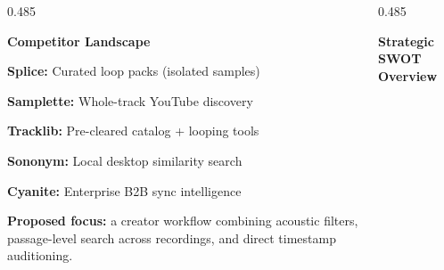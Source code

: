 \begin{frame}[t]

  \begin{columns}[onlytextwidth, T]
    \begin{column}{0.485\textwidth}
      \begin{tcolorbox}[standardcard, top=3.5pt, bottom=3.5pt, left=6pt, right=6pt]
        {\scriptsize\bfseries\textcolor{textwhite}{Competitor Landscape}}\par\vspace{1.2mm}
        
        \begin{compactlist}
          \tiny
          \item \textbf{Splice:} Curated loop packs (isolated samples)
          \item \textbf{Samplette:} Whole-track YouTube discovery
          \item \textbf{Tracklib:} Pre-cleared catalog + looping tools
          \item \textbf{Sononym:} Local desktop similarity search
          \item \textbf{Cyanite:} Enterprise B2B sync intelligence
        \end{compactlist}

        \vspace{1.5mm}
        \begin{tcolorbox}[enhanced, colback=cardinner, colframe=accentemerald, boxrule=0.8pt, arc=3pt, top=3pt, bottom=3pt, left=5pt, right=5pt]
          {\tiny\textbf{\textcolor{accentemerald}{Proposed focus:}} \textcolor{textwhite}{a creator workflow combining acoustic filters, passage-level search across recordings, and direct timestamp auditioning.}}
        \end{tcolorbox}
      \end{tcolorbox}
    \end{column}

    \begin{column}{0.485\textwidth}
      \begin{tcolorbox}[standardcard, top=3.5pt, bottom=3.5pt, left=6pt, right=6pt]
        {\scriptsize\bfseries\textcolor{textwhite}{Strategic SWOT Overview}}\par\vspace{1.2mm}
        

\end{tcolorbox}
\end{column}
\end{columns}
\end{frame}
